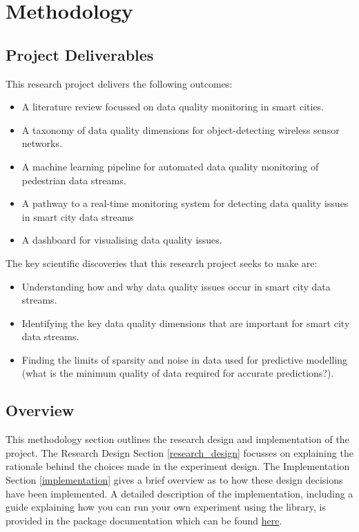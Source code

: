 \section{Methodology}

\subsection{Project Deliverables}

This research project delivers the following outcomes:

\begin{itemize}
    \item A literature review focussed on data quality monitoring in smart cities.
    \item A taxonomy of data quality dimensions for object-detecting wireless sensor networks.
    \item A machine learning pipeline for automated data quality monitoring of pedestrian data streams.
    \item A pathway to a real-time monitoring system for detecting data quality issues in smart city data streams
    \item A dashboard for visualising data quality issues.
\end{itemize}

The key scientific discoveries that this research project seeks to make are:

\begin{itemize}
    \item Understanding how and why data quality issues occur in smart city data streams.
    \item Identifying the key data quality dimensions that are important for smart city data streams.
    \item Finding the limits of sparsity and noise in data used for predictive modelling (what is the minimum quality of data required for accurate predictions?).
\end{itemize}

\subsection{Overview}

This methodology section outlines the research design and implementation of the project. The Research Design Section \ref{research_design} focusses on explaining the rationale behind the choices made in the experiment design. The Implementation Section \ref{implementation} gives a brief overview as to how these design decisions have been implemented. A detailed description of the implementation, including a guide explaining how you can run your own experiment using the library, is provided in the package documentation which can be found \href{https://carrowmw.github.io/phd-project/pipeline_module/overview/}{here}.

